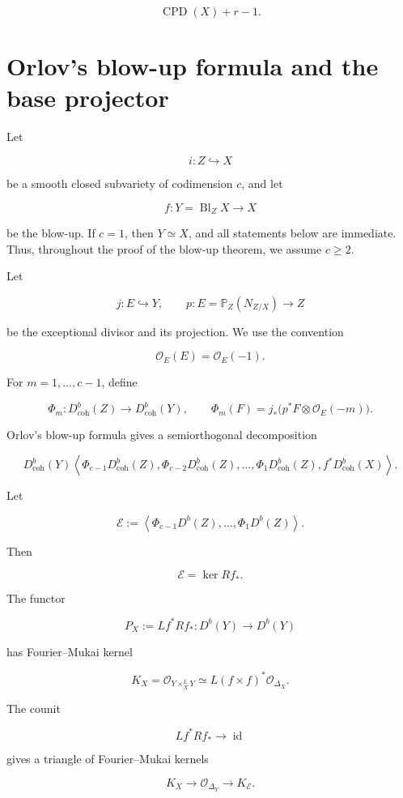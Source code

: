 \documentclass[11pt]{amsart}
\theoremstyle{definition}
\begin{document}
\[
\operatorname{CPD}(X)+r-1.
\]

\section{Orlov's blow-up formula and the base projector}

Let

\[
i:Z\hookrightarrow X
\]

be a smooth closed subvariety of codimension $c$, and let

\[
f:Y=\operatorname{Bl}_ZX\to X
\]

be the blow-up. If $c=1$, then $Y\simeq X$, and all statements below are immediate. Thus, throughout the proof of the blow-up theorem, we assume $c\ge2$.

Let

\[
j:E\hookrightarrow Y,
\qquad
p:E=\mathbb P_Z(N_{Z/X})\to Z
\]

be the exceptional divisor and its projection. We use the convention

\[
\mathcal O_E(E)=\mathcal O_E(-1).
\]

For $m=1,\dots,c-1$, define

\[
\Phi_m:D^b_{\mathrm{coh}}(Z)\to D^b_{\mathrm{coh}}(Y),
\qquad
\Phi_m(F)=j_*\bigl(p^*F\otimes\mathcal O_E(-m)\bigr).
\]

Orlov's blow-up formula gives a semiorthogonal decomposition

\[
D^b_{\mathrm{coh}}(Y)
\left\langle
\Phi_{c-1}D^b_{\mathrm{coh}}(Z),
\Phi_{c-2}D^b_{\mathrm{coh}}(Z),
\dots,
\Phi_1D^b_{\mathrm{coh}}(Z),
f^*D^b_{\mathrm{coh}}(X)
\right\rangle.
\tag{3.1}
\]

Let

\[
\mathcal E:=
\left\langle
\Phi_{c-1}D^b(Z),
\dots,
\Phi_1D^b(Z)
\right\rangle.
\]

Then

\[
\mathcal E=\ker Rf_*.
\]

The functor

\[
P_X:=Lf^*Rf_*:D^b(Y)\to D^b(Y)
\]

has Fourier--Mukai kernel

\[
K_X=\mathcal O_{Y\times_X^L Y}
\simeq L(f\times f)^*\mathcal O_{\Delta_X}.
\tag{3.2}
\]

The counit

\[
Lf^*Rf_*\to \operatorname{id}
\]

gives a triangle of Fourier--Mukai kernels

\[
K_X\longrightarrow \mathcal O_{\Delta_Y}\longrightarrow K_{\mathcal E}.
\tag{3.3}
\]
\end{document}
